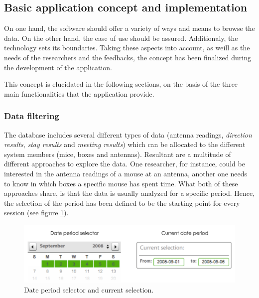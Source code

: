 \subsection{Basic application concept and implementation}
\label{subsec:app_concept}

On one hand, the software should offer a variety of ways and means to browse the data. On the other hand, the ease uf use should be assured. Additionaly, the technology sets its boundaries. Taking these aspects into account, as weill as the needs of the researchers and the feedbacks, the concept has been finalized during the development of the application. 

This concept is elucidated in the following sections, on the basis of the three main functionalities that the application provide. 
   
\subsubsection{Data filtering}
\label{sububsec:datafilter}

The database includes several different types of data (antenna readings, \textit{direction results}, \textit{stay results} and \textit{meeting results}) which can be allocated to the different system members (mice, boxes and antennas). Resultant are a multitude of different approaches to explore the data. One researcher, for instance, could be interested in the antenna readings of a mouse at an antenna, another one needs to know in which boxes a specific mouse has spent time. What both of these approaches share, is that the data is usually analyzed for a specific period. Hence, the selection of the period has been defined to be the starting point for every session (see figure \ref{fig:date_period}).

\begin{figure}[htpb]
\begin{center}
  \includegraphics[width=.75\textwidth]{assets/pdf/date_period.pdf}
  \caption[Date period selection]{Date period selector and current selection.}
  \label{fig:date_period}
\end{center}
\end{figure}

